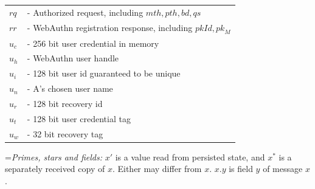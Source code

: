 \documentclass{article}
\newlength{\stanzagap}
\newlength{\notegap}
\newlength{\stanzawidth}
\newlength{\stanzabox}
\newenvironment{stanza}[1][\stanzawidth]
  {\par\addvspace{\stanzagap}%
   \setlength{\stanzabox}{\dimexpr\linewidth-\parindent\relax}%
   \ifdim\stanzabox>#1\setlength{\stanzabox}{#1}\fi
   \noindent\hspace*{\parindent}\begin{minipage}{\stanzabox}}
  {\end{minipage}\par\addvspace{\stanzagap}}
\begin{document}
\begin{stanza}
\begin{tabular}{@{}p{5mm} l}
$\mathit{rq}$ & \textrm{ - Authorized request, including }$\mathit{mth}, \mathit{pth}, \mathit{bd}, \mathit{qs}$\\
$\mathit{rr}$ & \textrm{ - WebAuthn registration response, including }$\mathit{pkId}, \mathit{pk}_M$\\
$u_c$ & \textrm{ - 256 bit user credential in memory}\\
$u_h$ & \textrm{ - WebAuthn user handle} \\
$u_i$ & \textrm{ - 128 bit user id guaranteed to be unique} \\
$u_n$ & \textrm{ - A's chosen user name} \\
$u_r$ & \textrm{ - 128 bit recovery id} \\
$u_t$ & \textrm{ - 128 bit user credential tag} \\
$u_w$ & \textrm{ - 32 bit recovery tag} \\
\end{tabular}

\vspace{\notegap}

{\leftskip=\parindent\noindent\textit{Primes, stars and fields:} $x'$ is a value read from persisted state, and $x^*$ is a separately received copy of $x$. Either may differ from $x$. $x.y$ is field $y$ of message $x$.\par}
\end{stanza}
\end{document}
